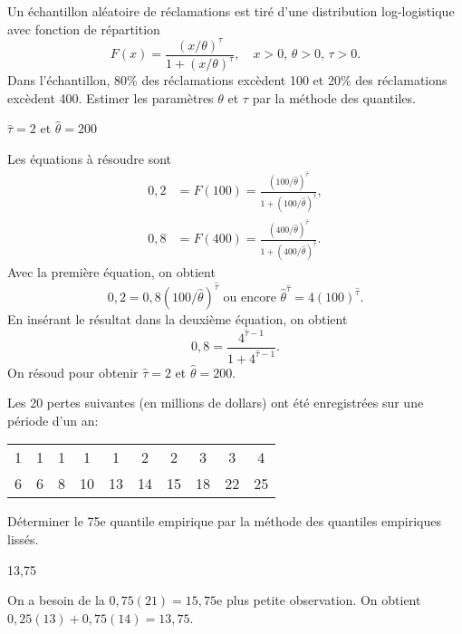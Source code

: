 \begin{exercice}
Un échantillon aléatoire de réclamations est tiré d'une distribution log-logistique avec fonction de répartition
$$
F(x)=\frac{(x/\theta)^\tau}{1+(x/\theta)^\tau}, \quad x>0, \, \theta >0, \, \tau >0.
$$
Dans l'échantillon, 80\% des réclamations excèdent 100 et 20\% des réclamations excèdent 400. Estimer les paramètres $\theta$ et $\tau$ par la méthode des quantiles.

\begin{rep}
$\hat{\tau}=2$ et $\hat{\theta}=200$
\end{rep}

\begin{sol}
Les équations à résoudre sont
\begin{align*}
0,2 &= F(100) = \frac{(100/\hat{\theta})^{\hat{\tau}}}{1+(100/\hat{\theta})^{\hat{\tau}}}, \\
0,8 &= F(400) = \frac{(400/\hat{\theta})^{\hat{\tau}}}{1+(400/\hat{\theta})^{\hat{\tau}}}.
\end{align*}
Avec la première équation, on obtient
$$
0,2=0,8(100/\hat{\theta})^{\hat{\tau}} \text{ ou encore } \hat{\theta}^{\hat{\tau}}=4(100)^{\hat{\tau}}. 
$$
En insérant le résultat dans la deuxième équation, on obtient
$$
0,8=\frac{4^{\hat{\tau}-1}}{1+4^{\hat{\tau}-1}}.
$$
On résoud pour obtenir $\hat{\tau}=2$ et $\hat{\theta}=200$.
\end{sol}
\end{exercice}

\begin{exercice}
Les 20 pertes suivantes (en millions de dollars) ont été enregistrées sur une période d'un an:
\begin{center}
\begin{tabular}{cccccccccc}
1 & 1 & 1 & 1 & 1 & 2 & 2 & 3 & 3 & 4 \\
6 & 6 & 8 & 10 & 13 & 14 & 15 & 18 & 22 & 25
\end{tabular}
\end{center}
Déterminer le 75e quantile empirique par la méthode des quantiles empiriques lissés.

\begin{rep}
13,75
\end{rep}

\begin{sol}
On a besoin de la $0,75(21)=15,75$e plus petite observation. On obtient $0,25(13) + 0,75(14)= 13,75$.
\end{sol}
\end{exercice}

